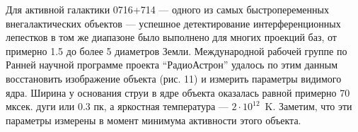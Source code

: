 Для активной галактики 0716+714 --- одного из самых быстропеременных внегалактических объектов ---
успешное детектирование интерференционных лепестков в том же диапазоне было выполнено для многих
проекций баз, от примерно 1.5 до более 5 диаметров Земли. Международной рабочей группе по Ранней
научной программе проекта ``РадиоАстрон'' удалось по этим данным восстановить изображение объекта
(рис. 11) и измерить параметры видимого ядра. Ширина у основания струи в ядре объекта оказалась
равной примерно 70 мксек. дуги или 0.3 пк, а яркостная температура --- $2 \cdot 10^{12}$~K. Заметим,
что эти параметры измерены в момент минимума активности этого объекта.

\begin{figure}[]
\end{figure}
